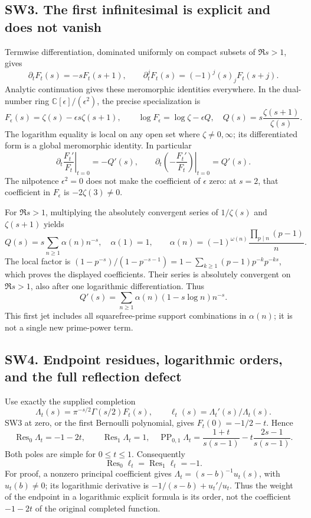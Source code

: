 \documentclass[
  10pt,
  a4paper,
]{article}
\begin{document}
\subsection{SW3. The first infinitesimal is explicit and does not
vanish}\label{sw3.-the-first-infinitesimal-is-explicit-and-does-not-vanish}

Termwise differentiation, dominated uniformly on compact subsets of
\(\Re s>1\), gives \[
\partial_t F_t(s)=-sF_t(s+1),\qquad
\partial_t^jF_t(s)=(-1)^j(s)_j F_t(s+j).
\tag{SW4}
\] Analytic continuation gives these meromorphic identities everywhere.
In the dual-number ring \(\mathbb C[\epsilon]/(\epsilon^2)\), the
precise specialization is \[
F_\epsilon(s)=\zeta(s)-\epsilon s\zeta(s+1),\qquad
\log F_\epsilon=\log\zeta-\epsilon Q,
\quad Q(s)=s\frac{\zeta(s+1)}{\zeta(s)}.
\tag{SW5}
\] The logarithm equality is local on any open set where
\(\zeta\ne0,\infty\); its differentiated form is a global meromorphic
identity. In particular \[
\left.\partial_t\frac{F_t'}{F_t}\right|_{t=0}=-Q'(s),
\qquad
\left.\partial_t\left(-\frac{F_t'}{F_t}\right)\right|_{t=0}=Q'(s).
\tag{SW6}
\] The nilpotence \(\epsilon^2=0\) does not make the coefficient of
\(\epsilon\) zero: at \(s=2\), that coefficient in \(F_\epsilon\) is
\(-2\zeta(3)\ne0\).

For \(\Re s>1\), multiplying the absolutely convergent series of
\(1/\zeta(s)\) and \(\zeta(s+1)\) yields \[
Q(s)=s\sum_{n\ge1}\alpha(n)n^{-s},\quad
\alpha(1)=1,\qquad
\alpha(n)=(-1)^{\omega(n)}\frac{\prod_{p\mid n}(p-1)}n.
\tag{SW7}
\] The local factor is
\((1-p^{-s})/(1-p^{-s-1})=1-\sum_{k\ge1}(p-1)p^{-k}p^{-ks}\), which
proves the displayed coefficients. Their series is absolutely convergent
on \(\Re s>1\), also after one logarithmic differentiation. Thus \[
Q'(s)=\sum_{n\ge1}\alpha(n)(1-s\log n)n^{-s}.
\tag{SW8}
\] This first jet includes all squarefree-prime support combinations in
\(\alpha(n)\); it is not a single new prime-power term.

\subsection{SW4. Endpoint residues, logarithmic orders, and the full
reflection
defect}\label{sw4.-endpoint-residues-logarithmic-orders-and-the-full-reflection-defect}

Use exactly the supplied completion \[
\Lambda_t(s)=\pi^{-s/2}\Gamma(s/2)F_t(s),\qquad
\ell_t(s)=\Lambda_t'(s)/\Lambda_t(s).
\tag{SW9}
\] SW3 at zero, or the first Bernoulli polynomial, gives
\(F_t(0)=-1/2-t\). Hence \[
\operatorname {Res}_0\Lambda_t=-1-2t,\qquad
\operatorname {Res}_1\Lambda_t=1,
\quad
\operatorname {PP}_{0,1}\Lambda_t
=\frac{1+t}{s(s-1)}-t\frac{2s-1}{s(s-1)}.
\tag{SW10}
\] Both poles are simple for \(0\le t\le1\). Consequently \[
\operatorname {Res}_0\ell_t=\operatorname {Res}_1\ell_t=-1.
\tag{SW11}
\] For proof, a nonzero principal coefficient gives
\(\Lambda_t=(s-b)^{-1}u_t(s)\), with \(u_t(b)\ne0\); its logarithmic
derivative is \(-1/(s-b)+u_t'/u_t\). Thus the weight of the endpoint in
a logarithmic explicit formula is its order, not the coefficient
\(-1-2t\) of the original completed function.
\end{document}
